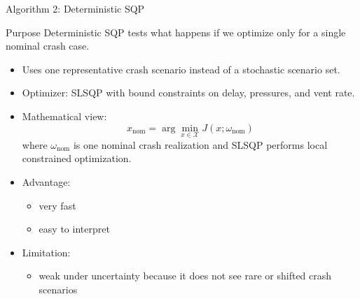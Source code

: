 \documentclass[aspectratio=169]{beamer}
\begin{document}
\begin{frame}{Algorithm 2: Deterministic SQP}
  \small
  \begin{block}{Purpose}
    Deterministic SQP tests what happens if we optimize only for a single nominal crash case.
  \end{block}

  \begin{itemize}
    \item Uses one representative crash scenario instead of a stochastic scenario set.
    \item Optimizer: SLSQP with bound constraints on delay, pressures, and vent rate.
    \item Mathematical view:
    \[
    x_{\mathrm{nom}}
    =
    \arg\min_{x \in \mathcal{X}} J(x;\omega_{\mathrm{nom}})
    \]
    where \(\omega_{\mathrm{nom}}\) is one nominal crash realization and SLSQP performs local constrained optimization.
    \item Advantage:
    \begin{itemize}
      \item very fast
      \item easy to interpret
    \end{itemize}
    \item Limitation:
    \begin{itemize}
      \item weak under uncertainty because it does not see rare or shifted crash scenarios
    \end{itemize}
  \end{itemize}
\end{frame}
\end{document}
